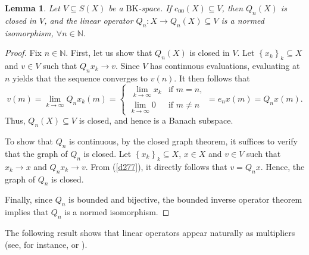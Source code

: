 \documentclass[14pt, a4paper]{article}  %
\providecommand{\llave}[1]{\left\lbrace #1\right\rbrace }
\providecommand{\pare}[1]{\left( #1\right) }
\newcommand{\tien}{\rightarrow}
\newcommand{\N}{\mathbb{N}}
\newcommand{\BK}{\text{BK}}
\newtheorem{lemma}{Lemma}[section]
\begin{document}
\begin{lemma}\label{d278_1}
	Let  $V\subseteq S\pare{X}$ be a $\BK$-space. If  $c_{00}\pare{X}\subseteq V$, then $Q_{n}\pare{X}$ is closed in $V$, and the  linear operator $Q_{n}:X\tien Q_{n}\pare{X}\subseteq V$  is a normed isomorphism,  $\forall n\in \N$.
\end{lemma}
\begin{proof}
	Fix  $n\in \N$.  
	First, let us show that $Q_{n}\pare{X}$ is closed in $V$. Let  $\llave{x_{k}}_{k}\subseteq X$ and $v\in V$ such that $Q_{n}x_{k}\tien v$. Since  $V$ has continuous evaluations, evaluating at $n$  yields that the sequence converges to $v\pare{n}$. It then follows that
	\begin{equation}\label{d277}
		v\pare{m} = \lim_{k\tien \infty}Q_{n}x_{k}\pare{m}= \left \{ \begin{matrix} \ \lim_{k\tien \infty}x_{k} & \mbox{if }m=n,
			\\ \lim_{k\tien \infty}0 & \mbox{if }m\neq n\end{matrix}\right.= e_{n}x\pare{m}=Q_{n}x\pare{m}.
	\end{equation}
	Thus,  $Q_{n}\pare{X}\subseteq V$ is closed, and hence is a Banach subspace.
	
	To show that $Q_{n}$ is continuous, by the closed graph theorem, it suffices to verify that the graph of $Q_{n}$ is closed. Let $\llave{x_{k}}_{k}\subseteq X$, $x\in X$ and $v\in V$ such that $x_{k}\tien x$ and $Q_{n}x_{k}\tien v$. From   (\ref{d277}), it directly follows that $v=Q_{n}x$. Hence, the graph of $Q_{n}$ is closed.
	
	Finally, since  $Q_{n}$ is bounded and bijective, the bounded inverse operator theorem implies that $Q_{n}$ is a normed isomorphism.
\end{proof}

 
The following result shows that linear operators appear naturally as multipliers (see, for instance, \cite{BCLS} or \cite{CPSW}).
 
\end{document}
